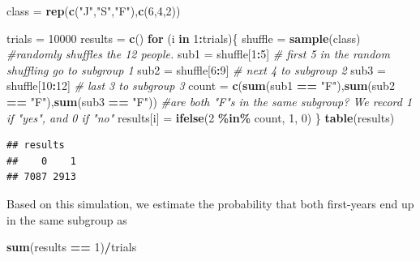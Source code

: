 \documentclass[
]{book}
\newenvironment{Shaded}{\begin{snugshade}}{\end{snugshade}}
\newcommand{\CommentTok}[1]{\textcolor[rgb]{0.56,0.35,0.01}{\textit{#1}}}
\newcommand{\ControlFlowTok}[1]{\textcolor[rgb]{0.13,0.29,0.53}{\textbf{#1}}}
\newcommand{\DecValTok}[1]{\textcolor[rgb]{0.00,0.00,0.81}{#1}}
\newcommand{\FunctionTok}[1]{\textcolor[rgb]{0.13,0.29,0.53}{\textbf{#1}}}
\newcommand{\NormalTok}[1]{#1}
\newcommand{\OtherTok}[1]{\textcolor[rgb]{0.56,0.35,0.01}{#1}}
\newcommand{\SpecialCharTok}[1]{\textcolor[rgb]{0.81,0.36,0.00}{\textbf{#1}}}
\newcommand{\StringTok}[1]{\textcolor[rgb]{0.31,0.60,0.02}{#1}}
\theoremstyle{definition}
\theoremstyle{definition}
\theoremstyle{definition}
\theoremstyle{definition}
\theoremstyle{remark}
\begin{document}
\begin{Shaded}
\begin{Highlighting}[]
\NormalTok{class }\OtherTok{=} \FunctionTok{rep}\NormalTok{(}\FunctionTok{c}\NormalTok{(}\StringTok{"J"}\NormalTok{,}\StringTok{"S"}\NormalTok{,}\StringTok{"F"}\NormalTok{),}\FunctionTok{c}\NormalTok{(}\DecValTok{6}\NormalTok{,}\DecValTok{4}\NormalTok{,}\DecValTok{2}\NormalTok{))}

\NormalTok{trials }\OtherTok{=} \DecValTok{10000}
\NormalTok{results }\OtherTok{=} \FunctionTok{c}\NormalTok{()}
\ControlFlowTok{for}\NormalTok{ (i }\ControlFlowTok{in} \DecValTok{1}\SpecialCharTok{:}\NormalTok{trials)\{}
\NormalTok{  shuffle }\OtherTok{=} \FunctionTok{sample}\NormalTok{(class) }\CommentTok{\#randomly shuffles the 12 people.}
\NormalTok{  sub1 }\OtherTok{=}\NormalTok{ shuffle[}\DecValTok{1}\SpecialCharTok{:}\DecValTok{5}\NormalTok{]  }\CommentTok{\# first 5 in the random shuffling go to subgroup 1}
\NormalTok{  sub2 }\OtherTok{=}\NormalTok{ shuffle[}\DecValTok{6}\SpecialCharTok{:}\DecValTok{9}\NormalTok{] }\CommentTok{\# next 4 to subgroup 2}
\NormalTok{  sub3 }\OtherTok{=}\NormalTok{ shuffle[}\DecValTok{10}\SpecialCharTok{:}\DecValTok{12}\NormalTok{] }\CommentTok{\# last 3 to subgroup 3}
\NormalTok{  count }\OtherTok{=} \FunctionTok{c}\NormalTok{(}\FunctionTok{sum}\NormalTok{(sub1 }\SpecialCharTok{==} \StringTok{"F"}\NormalTok{),}\FunctionTok{sum}\NormalTok{(sub2 }\SpecialCharTok{==} \StringTok{"F"}\NormalTok{),}\FunctionTok{sum}\NormalTok{(sub3 }\SpecialCharTok{==} \StringTok{"F"}\NormalTok{))}
  \CommentTok{\#are both "F"s in the same subgroup? We record 1 if "yes", and 0 if "no"}
\NormalTok{  results[i] }\OtherTok{=} \FunctionTok{ifelse}\NormalTok{(}\DecValTok{2} \SpecialCharTok{\%in\%}\NormalTok{ count, }\DecValTok{1}\NormalTok{, }\DecValTok{0}\NormalTok{)}
\NormalTok{\}}
\FunctionTok{table}\NormalTok{(results)}
\end{Highlighting}
\end{Shaded}

\begin{verbatim}
## results
##    0    1 
## 7087 2913
\end{verbatim}

Based on this simulation, we estimate the probability that both first-years end up in the same subgroup as

\begin{Shaded}
\begin{Highlighting}[]
\FunctionTok{sum}\NormalTok{(results }\SpecialCharTok{==} \DecValTok{1}\NormalTok{)}\SpecialCharTok{/}\NormalTok{trials}
\end{Highlighting}
\end{Shaded}
\end{document}
